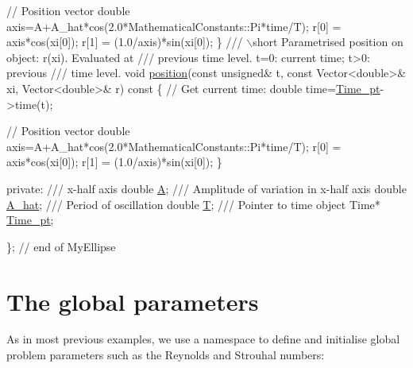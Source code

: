 \begin{DoxyCodeInclude}
   \textcolor{comment}{// Position vector}
   \textcolor{keywordtype}{double} axis=A+A\_hat*cos(2.0*MathematicalConstants::Pi*time/T);
   r[0] = axis*cos(xi[0]);
   r[1] = (1.0/axis)*sin(xi[0]);
  \} 
\textcolor{comment}{}
\textcolor{comment}{ /// \(\backslash\)short Parametrised position on object: r(xi). Evaluated at}
\textcolor{comment}{ /// previous time level. t=0: current time; t>0: previous}
\textcolor{comment}{ /// time level.}
\textcolor{comment}{} \textcolor{keywordtype}{void} \hyperlink{classMyEllipse_a7b139a2f4564005773c83325f2414e3e}{position}(\textcolor{keyword}{const} \textcolor{keywordtype}{unsigned}& t, \textcolor{keyword}{const} Vector<double>& xi,
               Vector<double>& r)\textcolor{keyword}{ const}
\textcolor{keyword}{  }\{
   \textcolor{comment}{// Get current time:}
   \textcolor{keywordtype}{double} time=\hyperlink{classMyEllipse_abc1c4c863a599ce87bdff1abb9971953}{Time\_pt}->time(t);
   
   \textcolor{comment}{// Position vector}
   \textcolor{keywordtype}{double} axis=A+A\_hat*cos(2.0*MathematicalConstants::Pi*time/T);
   r[0] = axis*cos(xi[0]);
   r[1] = (1.0/axis)*sin(xi[0]);
  \} 

\textcolor{keyword}{private}:
\textcolor{comment}{}
\textcolor{comment}{ /// x-half axis}
\textcolor{comment}{} \textcolor{keywordtype}{double} \hyperlink{classMyEllipse_aa2a0efd0a39f9d4fc307a6ff011682ed}{A};
\textcolor{comment}{}
\textcolor{comment}{ /// Amplitude of variation in x-half axis}
\textcolor{comment}{} \textcolor{keywordtype}{double} \hyperlink{classMyEllipse_a653e71cf296cdc86cc595d16f18004dd}{A\_hat};
\textcolor{comment}{}
\textcolor{comment}{ /// Period of oscillation}
\textcolor{comment}{} \textcolor{keywordtype}{double} \hyperlink{classMyEllipse_ab098069ab23bbbd8f30b0da3523dc87f}{T};
\textcolor{comment}{}
\textcolor{comment}{ /// Pointer to time object}
\textcolor{comment}{} Time* \hyperlink{classMyEllipse_abc1c4c863a599ce87bdff1abb9971953}{Time\_pt};

\}; \textcolor{comment}{// end of MyEllipse}

\end{DoxyCodeInclude}




 

\hypertarget{index_namespace}{}\section{The global parameters}\label{index_namespace}
As in most previous examples, we use a namespace to define and initialise global problem parameters such as the Reynolds and Strouhal numbers\+:

